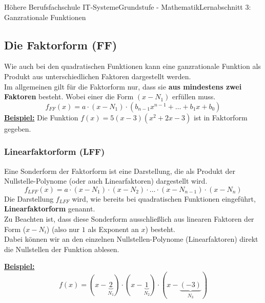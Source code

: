 \documentclass[11pt,twocolumn,oneside,openany,headings=optiontotoc,11pt,numbers=noenddot]{article}
\begin{document}
\begin{worksheet}{Höhere Berufsfachschule IT-Systeme}{Grundstufe - Mathematik}{Lernabschnitt 3: Ganzrationale Funktionen}
		\subsection*{Die Faktorform (FF)}
		Wie auch bei den quadratischen Funktionen kann eine ganzrationale Funktion als Produkt aus unterschiedlichen Faktoren dargestellt werden.\\
		Im allgemeinen gilt für die Faktorform nur, dass sie \textbf{aus mindestens zwei Faktoren} besteht. Wobei einer die Form \((x-N_1)\) erfüllen muss.
		\[f_{FF}(x) = a\cdot{}(x-N_1)\cdot{}(b_{n-1}x^{n-1}+\ldots{}+b_1x+ b_0)\]
		\textbf{\underline{Beispiel:}} Die Funktion \(f(x) = 5(x-3)(x^2+2x-3)\) ist in Faktorform gegeben.
		\subsubsection*{Linearfaktorform (LFF)}
		Eine Sonderform der Faktorform ist eine Darstellung, die als Produkt der \grq{}Nullstelle-Polynome\grq{} (oder auch Linearfaktoren) dargestellt wird.
		\[f_{LFF}(x) = a\cdot{}(x-N_1)\cdot{}(x-N_2)\cdot{}\ldots{}\cdot{}(x-N_{n-1})\cdot{}(x-N_n)\]
		Die Darstellung \(f_{LFF}\) wird, wie bereits bei quadratischen Funktionen eingeführt, \textbf{Linearfaktorform} genannt.\\
		Zu Beachten ist, dass diese Sonderform ausschließlich aus linearen Faktoren der Form (\(x-N_i\)) (also nur \(1\) als Exponent an \(x\)) besteht.\\
		Dabei können wir an den einzelnen \grq{}Nullstellen-Polynome\grq{} (Linearfaktoren) direkt die Nullstellen der Funktion ablesen.\\
		\par\noindent
		\underline{\textbf{Beispiel:}}\[f(x) = (x-\underbrace{2}_{N_1})\cdot(x-\underbrace{1}_{N_2})\cdot(x-\underbrace{(-3)}_{N_3})\]

\end{worksheet}
\end{document}
